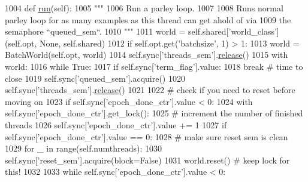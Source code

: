 \begin{DoxyCode}
1004     \textcolor{keyword}{def }\hyperlink{namespaceparlai_1_1agents_1_1tfidf__retriever_1_1build__tfidf_a0d8cca9dbdf0fa23d25e81ec2a96b347}{run}(self):
1005         \textcolor{stringliteral}{"""}
1006 \textcolor{stringliteral}{        Run a parley loop.}
1007 \textcolor{stringliteral}{}
1008 \textcolor{stringliteral}{        Runs normal parley loop for as many examples as this thread can get ahold of via}
1009 \textcolor{stringliteral}{        the semaphore ``queued\_sem``.}
1010 \textcolor{stringliteral}{        """}
1011         world = self.shared[\textcolor{stringliteral}{'world\_class'}](self.opt, \textcolor{keywordtype}{None}, self.shared)
1012         \textcolor{keywordflow}{if} self.opt.get(\textcolor{stringliteral}{'batchsize'}, 1) > 1:
1013             world = BatchWorld(self.opt, world)
1014         self.sync[\textcolor{stringliteral}{'threads\_sem'}].\hyperlink{namespaceconf_a325dc746d8bf05c54d26351c35a21d90}{release}()
1015         with world:
1016             \textcolor{keywordflow}{while} \textcolor{keyword}{True}:
1017                 \textcolor{keywordflow}{if} self.sync[\textcolor{stringliteral}{'term\_flag'}].value:
1018                     \textcolor{keywordflow}{break}  \textcolor{comment}{# time to close}
1019                 self.sync[\textcolor{stringliteral}{'queued\_sem'}].acquire()
1020                 self.sync[\textcolor{stringliteral}{'threads\_sem'}].\hyperlink{namespaceconf_a325dc746d8bf05c54d26351c35a21d90}{release}()
1021 
1022                 \textcolor{comment}{# check if you need to reset before moving on}
1023                 \textcolor{keywordflow}{if} self.sync[\textcolor{stringliteral}{'epoch\_done\_ctr'}].value < 0:
1024                     with self.sync[\textcolor{stringliteral}{'epoch\_done\_ctr'}].get\_lock():
1025                         \textcolor{comment}{# increment the number of finished threads}
1026                         self.sync[\textcolor{stringliteral}{'epoch\_done\_ctr'}].value += 1
1027                         \textcolor{keywordflow}{if} self.sync[\textcolor{stringliteral}{'epoch\_done\_ctr'}].value == 0:
1028                             \textcolor{comment}{# make sure reset sem is clean}
1029                             \textcolor{keywordflow}{for} \_ \textcolor{keywordflow}{in} range(self.numthreads):
1030                                 self.sync[\textcolor{stringliteral}{'reset\_sem'}].acquire(block=\textcolor{keyword}{False})
1031                         world.reset()  \textcolor{comment}{# keep lock for this!}
1032 
1033                 \textcolor{keywordflow}{while} self.sync[\textcolor{stringliteral}{'epoch\_done\_ctr'}].value < 0:

\end{DoxyCode}
